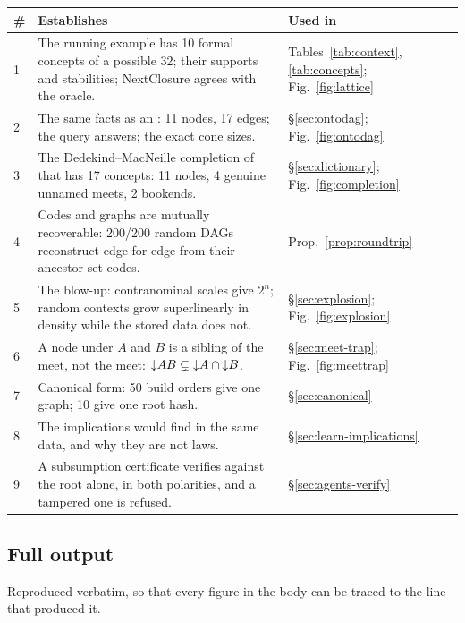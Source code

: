 \begin{center}\small
\begin{tabularx}{\textwidth}{@{}l p{8.1cm} X@{}}
\toprule
\textbf{\#} & \textbf{Establishes} & \textbf{Used in}\\
\midrule
1 & The running example has 10 formal concepts of a possible 32; their
    supports and stabilities; NextClosure agrees with the oracle.
  & Tables~\ref{tab:context}, \ref{tab:concepts};
    Fig.~\ref{fig:lattice}\\
2 & The same facts as an \odag{}: 11 nodes, 17 edges; the query answers; the
    exact cone sizes.
  & \S\ref{sec:ontodag}; Fig.~\ref{fig:ontodag}\\
3 & The Dedekind--MacNeille completion of that \odag{} has 17 concepts:
    11 nodes, 4 genuine unnamed meets, 2 bookends.
  & \S\ref{sec:dictionary}; Fig.~\ref{fig:completion}\\
4 & Codes and graphs are mutually recoverable: 200/200 random DAGs
    reconstruct edge-for-edge from their ancestor-set codes.
  & Prop.~\ref{prop:roundtrip}\\
5 & The blow-up: contranominal scales give $2^n$; random contexts grow
    superlinearly in density while the stored data does not.
  & \S\ref{sec:explosion}; Fig.~\ref{fig:explosion}\\
6 & A node under $A$ and $B$ is a sibling of the meet, not the meet:
    $\mathord{\downarrow}AB \subsetneq \mathord{\downarrow}A\cap\mathord{\downarrow}B$.
  & \S\ref{sec:meet-trap}; Fig.~\ref{fig:meettrap}\\
7 & Canonical form: 50 build orders give one graph; 10 give one root hash.
  & \S\ref{sec:canonical}\\
8 & The implications \fca{} would find in the same data, and why they are
    not laws.
  & \S\ref{sec:learn-implications}\\
9 & A subsumption certificate verifies against the root alone, in both
    polarities, and a tampered one is refused.
  & \S\ref{sec:agents-verify}\\
\bottomrule
\end{tabularx}
\end{center}

\subsection*{Full output}

Reproduced verbatim, so that every figure in the body can be traced to the
line that produced it.


